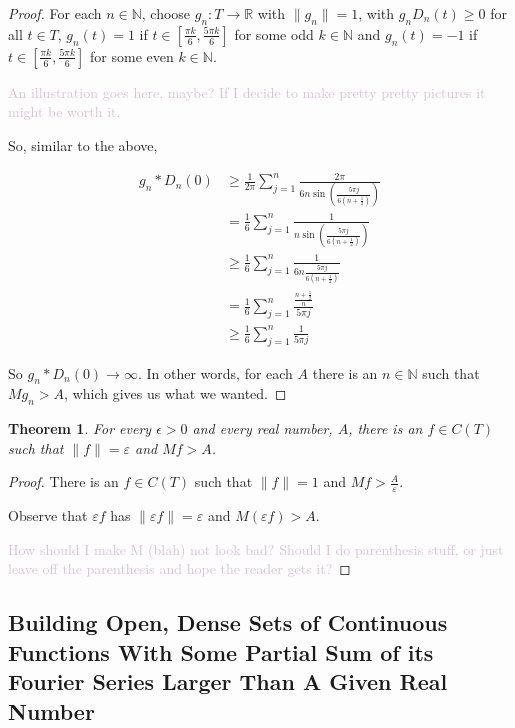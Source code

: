 \documentclass{amsart}
\newcommand{\ep}{\epsilon}
\newcommand{\vep}{\varepsilon}
\newcommand{\N}{\mathbb{N}}
\newcommand{\R}{\mathbb{R}}
\newcommand{\colorcomment}[2]{\textcolor{#1}{#2}} %
\newcommand{\norm}[1]{\|#1\|}
\newtheorem{thm}{Theorem}[section]
\theoremstyle{definition}
\begin{document}
\begin{proof}
For each $n \in \N$, choose $g_n: T \to \R$ with $\norm{g_n} = 1$, with $g_nD_n(t) \geq 0$ for all $t \in T$,  $g_n(t) = 1$ if $t \in [\frac{\pi k}{6},\frac{5 \pi k}{6}]$ for some odd $k \in \N$  and $g_n(t) = -1$ if $t \in [\frac{\pi k}{6},\frac{5 \pi k}{6}]$ for some even $k \in \N$.

\colorcomment{Thistle}{An illustration goes here, maybe? If I decide to make pretty pretty pictures it might be worth it.}

So, similar to the above,

\begin{align*}
g_n \ast D_n(0) &\geq \frac{1}{2 \pi} \sum\limits_{j=1}^n \frac{2 \pi}{6n \sin(\frac{5\pi j}{6(n+\frac{1}{2})})}\\
&= \frac{1}{6} \sum\limits_{j=1}^n \frac{1}{n \sin(\frac{5\pi j}{6(n+\frac{1}{2})})}\\
&\geq \frac{1}{6} \sum\limits_{j=1}^n \frac{1}{6n \frac{5\pi j}{6(n+\frac{1}{2})}}\\
&= \frac{1}{6} \sum\limits_{j=1}^n \frac{\frac{n+\frac{1}{2}}{n}}{5\pi j}\\
&\geq \frac{1}{6} \sum\limits_{j=1}^n \frac{1}{5\pi j}
\end{align*}

So $g_n \ast D_n(0) \to \infty$. In other words, for each $A$ there is an $n \in \N$ such that $Mg_n > A$, which gives us what we wanted.

\end{proof}

\begin{thm}
For every $\ep >0$ and every real number, $A$, there is an $f \in C(T)$ such that $\norm{f} = \vep $ and $Mf > A$. 

\end{thm}

\begin{proof}
There is an $f \in C(T)$ such that $\norm{f} = 1$ and $Mf > \frac{A}{\vep}$.

Observe that $\vep f$ has $\norm{\vep f} = \vep$ and $M(\vep f) > A$.

\colorcomment{Thistle}{How should I make M (blah) not look bad? Should I do parenthesis stuff, or just leave off the parenthesis and hope the reader gets it?}
\end{proof}

\subsection{Building Open, Dense Sets of Continuous Functions With Some Partial Sum of its Fourier Series Larger Than A Given Real Number}
\end{document}
